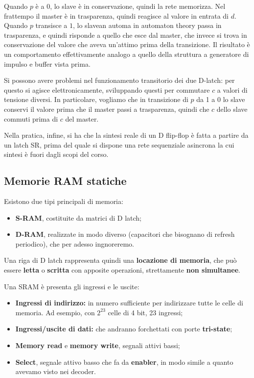 \documentclass[a4paper,11pt]{article}
\begin{document}
Quando $p$ è a 0, lo slave è in conservazione, quindi la rete memorizza.
Nel frattempo il master è in trasparenza, quindi reagisce al valore in entrata di $d$.
Quando $p$ transisce a $1$, lo slavean automa in automaton theory  passa in trasparenza, e quindi risponde a quello che esce dal master, che invece si trova in conservazione del valore che aveva un'attimo prima della transizione.
Il risultato è un comportamento effettivamente analogo a quello della struttura a generatore di impulso e buffer vista prima.

Si possono avere problemi nel funzionamento transitorio dei due D-latch: per questo si agisce elettronicamente, sviluppando questi per commutare $c$ a valori di tensione diversi.
In particolare, vogliamo che in transizione di $p$ da 1 a 0 lo slave conservi il valore prima che il master passi a trasparenza, quindi che $c$ dello slave commuti prima di $c$ del master.

Nella pratica, infine, si ha che la sintesi reale di un D flip-flop è fatta a partire da un latch SR, prima del quale si dispone una rete sequenziale asincrona la cui sintesi è fuori dagli scopi del corso.

\subsection{Memorie RAM statiche}
Esistono due tipi principali di memoria:
\begin{itemize}
	\item \textbf{S-RAM}, costituite da matrici di D latch;
	\item \textbf{D-RAM}, realizzate in modo diverso (capacitori che bisognano di refresh periodico), che per adesso ingnoreremo. 
\end{itemize}

Una riga di D latch rappresenta quindi una \textbf{locazione di memoria}, che può essere \textbf{letta} o \textbf{scritta} con apposite operazioni, strettamente \textbf{non simultanee}.

Una SRAM è presenta gli ingressi e le uscite:
\begin{itemize}
	\item \textbf{Ingressi di indirizzo:} in numero sufficiente per indirizzare tutte le celle di memoria. Ad esempio, con $2^{23}$ celle di 4 bit, 23 ingressi;
	\item \textbf{Ingressi/uscite di dati:} che andranno forchettati con porte \textbf{tri-state};
	\item \textbf{Memory read} e \textbf{memory write}, segnali attivi bassi;
	\item \textbf{Select}, segnale attivo basso che fa da \textbf{enabler}, in modo simile a quanto avevamo visto nei decoder.
\end{itemize}
\end{document}
